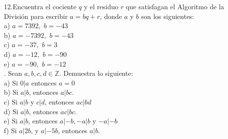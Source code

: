 \documentclass[letterpaper]{article}
\newcommand{\Z}{\mathds{Z}}
\renewcommand{\*}{\cdot}
\theoremstyle{definition}
\begin{document}
\noindent12.Encuentra el cociente $ q $ y el residuo $ r $  que satisfagan el Algoritmo de la División para escribir $ a = bq + r $, donde $ a $ y $ b $ son los siguientes:\\
a) $ a = 7392,  $  $ b = -43 $\\
b) $ a = -7392, $ $ b = -43 $\\
c) $ a = -37, $ $ b = 3 $\\
d) $ a = -12, $ $ b = -90 $\\
e) $ a = -90, $ $ b = -12 $\\

. Sean $ a,b,c,d \in \Z $. Demuestra lo siguiente:\\
a) Si $ 0|a $ entonces $ a = 0 $\\
b) Si $ a|b $, entonces $ a|bc $.\\
c) Si $ a|b $ y $ c|d $, entonces $ ac|bd $\\
d) Si $ a|b $, entonces $ ac|bc $.\\
e) Si $ a|b $, entonces $ a|-b, -a |b $ y $ -a | -b $\\
f) Si $ a|2b $, y $ a | -5b $, entonces $ a|b $.
\end{document}

